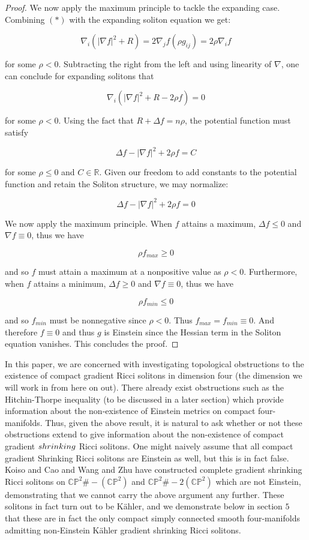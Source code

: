 \documentclass[openany, amssymb, psamsfonts]{amsart}
\theoremstyle{definition}
\numberwithin{equation}{section}
\begin{document}
\begin{proof}
We now apply the maximum principle to tackle the expanding case. Combining $(*)$ with the expanding soliton equation we get:

$$\nabla_i(|\nabla f|^2 + R) = 2 \nabla_j f (\rho g_{ij}) = 2\rho \nabla_i f$$

for some $\rho < 0$. Subtracting the right from the left and using linearity of $\nabla$, one can conclude for expanding solitons that 

$$\nabla_i(|\nabla f|^2 + R - 2\rho f) = 0$$

for some $\rho < 0$. Using the fact that $R + \Delta f = n\rho$, the potential function must satisfy

$$\Delta f - |\nabla f|^2 + 2\rho f = C$$

for some $\rho \leq 0$ and $C \in \mathbb{R}$. Given our freedom to add constants to the potential function and retain the Soliton structure, we may normalize: 

$$\Delta f - |\nabla f|^2 + 2\rho f = 0$$

We now apply the maximum principle. When $f$ attains a maximum, $\Delta f \leq 0$ and $\nabla f \equiv 0$, thus we have

$$\rho f_{max} \geq 0$$

and so $f$ must attain a maximum at a nonpositive value as $\rho < 0$. Furthermore, when $f$ attains a minimum, $\Delta f \geq 0$ and $\nabla f \equiv 0$, thus we have 

$$\rho f_{min} \leq 0$$

and so $f_{min}$ must be nonnegative since $\rho < 0$. Thus $f_{max} = f_{min} \equiv 0$. And therefore $f \equiv 0$ and thus $g$ is Einstein since the Hessian term in the Soliton equation vanishes. This concludes the proof.

\end{proof}

 In this paper, we are concerned with investigating topological obstructions to the existence of compact gradient Ricci solitons in dimension four (the dimension we will work in from here on out). There already exist obstructions such as the Hitchin-Thorpe inequality (to be discussed in a later section) which provide information about the non-existence of Einstein metrics on compact four-manifolds. Thus, given the above result, it is natural to ask whether or not these obstructions extend to give information about the non-existence of compact gradient $\emph{shrinking}$ Ricci solitons. One might naively assume that all compact gradient Shrinking Ricci solitons are Einstein as well, but this is in fact false. Koiso and Cao \cite{caoTwo} and Wang and Zhu \cite{wang} have constructed complete gradient shrinking Ricci solitons on $\mathbb{CP}^2 \# -(\mathbb{CP}^2)$ and $\mathbb{CP}^2 \# -2(\mathbb{CP}^2)$ which are not Einstein, demonstrating that we cannot carry the above argument any further. These solitons in fact turn out to be Kähler, and we demonstrate below in section $5$ that these are in fact the only compact simply connected smooth four-manifolds admitting non-Einstein Kähler gradient shrinking Ricci solitons. 
\end{document}
